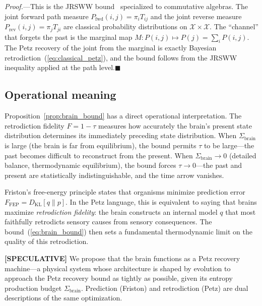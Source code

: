 \documentclass[prl,twocolumn,superscriptaddress,longbibliography,floatfix]{revtex4-2}
\newcommand{\tauasym}{\tau}
\newcommand{\Sbrain}{\Sigma_{\mathrm{brain}}}
\newcommand{\DKL}{D_{\mathrm{KL}}}
\newcommand{\Ffriston}{F_{\mathrm{FEP}}}
\begin{document}
\emph{Proof.}---This is the JRSWW bound~\cite{Junge2018} specialized
to commutative algebras.  The joint forward path measure
$P_{\mathrm{fwd}}(i,j) = \pi_i T_{ij}$ and the joint reverse
measure $P_{\mathrm{rev}}(i,j) = \pi_j T_{ji}$ are classical
probability distributions on $\mathcal{X}\times\mathcal{X}$.  The
``channel'' that forgets the past is the marginal map
$M\!: P(i,j) \mapsto P(j) = \sum_i P(i,j)$.  The Petz recovery of
the joint from the marginal is exactly Bayesian
retrodiction~(\ref{eq:classical_petz}), and the bound follows from
the JRSWW inequality applied at the path
level.\hfill$\blacksquare$

\subsection{Operational meaning}
\label{subsec:operational}

Proposition~\ref{prop:brain_bound} has a direct operational
interpretation.  The retrodiction fidelity $F = 1-\tauasym$ measures
how accurately the brain's present state distribution determines its
immediately preceding state distribution.  When $\Sbrain$ is large
(the brain is far from equilibrium), the bound permits $\tauasym$
to be large---the past becomes difficult to reconstruct from the
present.  When $\Sbrain\to 0$ (detailed balance, thermodynamic
equilibrium), the bound forces $\tauasym\to 0$---the past and
present are statistically indistinguishable, and the time arrow
vanishes.

Friston's free-energy principle states that organisms minimize
prediction error $\Ffriston = \DKL[q\|p]$.  In the Petz
language, this is equivalent to saying that brains maximize
\emph{retrodiction fidelity}: the brain constructs an internal
model $q$ that most faithfully retrodicts sensory causes from
sensory consequences.  The bound~(\ref{eq:brain_bound}) then
sets a fundamental thermodynamic limit on the quality of this
retrodiction.

\textbf{[SPECULATIVE]} We propose that the brain functions as a
Petz recovery machine---a physical system whose architecture is
shaped by evolution to approach the Petz recovery bound as
tightly as possible, given its entropy production budget
$\Sbrain$.  Prediction (Friston) and retrodiction (Petz) are dual
descriptions of the same optimization.


\end{document}
